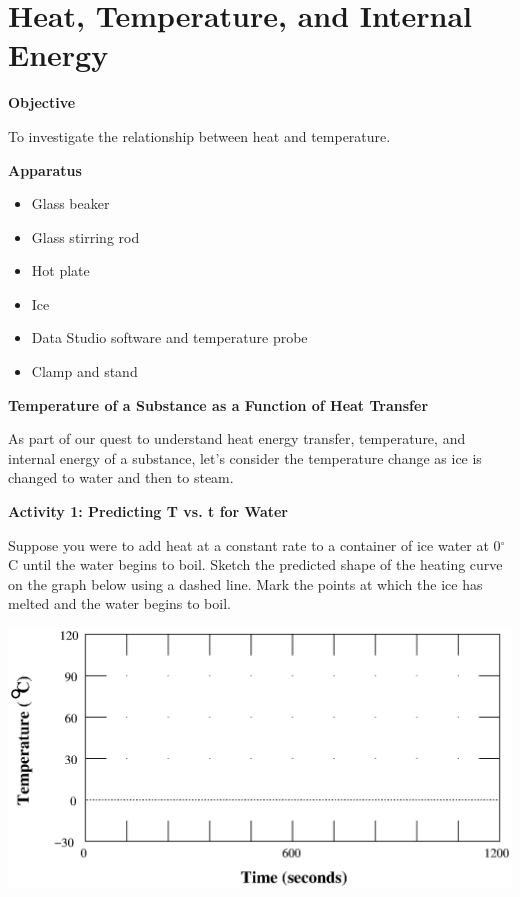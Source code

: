 
\section{Heat, Temperature, and Internal Energy}

\makelabheader %

\textbf{Objective}

To investigate the relationship between heat and temperature.

\textbf{Apparatus}

\begin{itemize}
\item Glass beaker 
\item Glass stirring rod
\item Hot plate
\item Ice
\item Data Studio software and temperature probe
\item Clamp and stand
\end{itemize}
\textbf{Temperature of a Substance as a Function of Heat Transfer}

As part of our quest to understand heat energy transfer, temperature,
and internal energy of a substance, let's consider the temperature
change as ice is changed to water and then to steam.

\textbf{Activity 1: Predicting T vs. t for Water} 

Suppose you were to add heat at a constant rate to a container of
ice water at 0\( ^{\circ } \)C until the water begins to boil. Sketch
the predicted shape of the heating curve on the graph below using
a dashed line. Mark the points at which the ice has melted and the
water begins to boil.

\vspace{0.3cm}
{\centering \includegraphics{heat_temp_int_energy/heat_temp_int_energy_fig_1.eps} \par}
\vspace{0.3cm}

